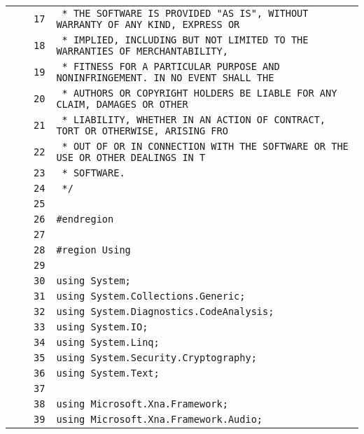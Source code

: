 \documentclass[a4paper,10pt]{article}
\begin{document}
\begin{longtable}[l]{lrrl}
\cellcolor{gray} &  & \verb~17~ & \verb~ * THE SOFTWARE IS PROVIDED "AS IS", WITHOUT WARRANTY OF ANY KIND, EXPRESS OR~\\
\cellcolor{gray} &  & \verb~18~ & \verb~ * IMPLIED, INCLUDING BUT NOT LIMITED TO THE WARRANTIES OF MERCHANTABILITY,~\\
\cellcolor{gray} &  & \verb~19~ & \verb~ * FITNESS FOR A PARTICULAR PURPOSE AND NONINFRINGEMENT. IN NO EVENT SHALL THE~\\
\cellcolor{gray} &  & \verb~20~ & \verb~ * AUTHORS OR COPYRIGHT HOLDERS BE LIABLE FOR ANY CLAIM, DAMAGES OR OTHER~\\
\cellcolor{gray} &  & \verb~21~ & \verb~ * LIABILITY, WHETHER IN AN ACTION OF CONTRACT, TORT OR OTHERWISE, ARISING FRO~\\
\cellcolor{gray} &  & \verb~22~ & \verb~ * OUT OF OR IN CONNECTION WITH THE SOFTWARE OR THE USE OR OTHER DEALINGS IN T~\\
\cellcolor{gray} &  & \verb~23~ & \verb~ * SOFTWARE.~\\
\cellcolor{gray} &  & \verb~24~ & \verb~ */~\\
\cellcolor{gray} &  & \verb~25~ & \verb~~\\
\cellcolor{gray} &  & \verb~26~ & \verb~#endregion~\\
\cellcolor{gray} &  & \verb~27~ & \verb~~\\
\cellcolor{gray} &  & \verb~28~ & \verb~#region Using~\\
\cellcolor{gray} &  & \verb~29~ & \verb~~\\
\cellcolor{gray} &  & \verb~30~ & \verb~using System;~\\
\cellcolor{gray} &  & \verb~31~ & \verb~using System.Collections.Generic;~\\
\cellcolor{gray} &  & \verb~32~ & \verb~using System.Diagnostics.CodeAnalysis;~\\
\cellcolor{gray} &  & \verb~33~ & \verb~using System.IO;~\\
\cellcolor{gray} &  & \verb~34~ & \verb~using System.Linq;~\\
\cellcolor{gray} &  & \verb~35~ & \verb~using System.Security.Cryptography;~\\
\cellcolor{gray} &  & \verb~36~ & \verb~using System.Text;~\\
\cellcolor{gray} &  & \verb~37~ & \verb~~\\
\cellcolor{gray} &  & \verb~38~ & \verb~using Microsoft.Xna.Framework;~\\
\cellcolor{gray} &  & \verb~39~ & \verb~using Microsoft.Xna.Framework.Audio;~\\

\end{longtable}
\end{document}
